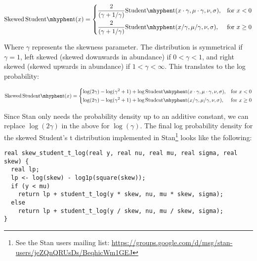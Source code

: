 \[
  \mathrm{Skewed\,Student\mhyphen t}(x) =
\begin{dcases}
\frac{2}{(\gamma + 1/\gamma)}
         \mathrm{Student\mhyphen t}(x \cdot \gamma, \mu \cdot \gamma, \nu, \sigma),& \text{for } x < 0\\
       \frac{2}{(\gamma + 1/\gamma)}
         \mathrm{Student\mhyphen t}(x / \gamma, \mu / \gamma, \nu, \sigma),& \text{for } x \ge 0
\end{dcases}
\]

\smallskip
\noindent
Where $\gamma$ represents the skewness parameter. The distribution is
symmetrical if $\gamma = 1$, left skewed (skewed downwards in abundance) if
$0 < \gamma < 1$, and right skewed (skewed upwards in abundance) if $1 <
\gamma < \infty$. This translates to the log probability:

\[
\mathrm{Skewed\,Student\mhyphen t}(x) =
\begin{dcases}
  \log (2 \gamma) - \log(\gamma^2 + 1) +
  \log \mathrm{Student\mhyphen t}(x \cdot \gamma, \mu \cdot \gamma, \nu, \sigma),& \text{for } x < 0\\
  \log (2 \gamma) - \log(\gamma^2 + 1) +
  \log \mathrm{Student\mhyphen t}(x / \gamma, \mu / \gamma, \nu, \sigma),& \text{for } x \ge 0
\end{dcases}
\]

\smallskip
\noindent
Since Stan only needs the probability density up to an additive constant, we
can replace $\log(2 \gamma)$ in the above for $\log(\gamma)$. The final log
probability density for the skewed Student's t distribution implemented in
Stan\footnote{See the Stan users mailing list: \url{https://groups.google.com/d/msg/stan-users/jeZQnQRUsDs/BeqhicWm1GEJ}} looks like the following:

\begin{verbatim}
real skew_student_t_log(real y, real nu, real mu, real sigma, real skew) {
  real lp;
  lp <- log(skew) - log1p(square(skew));
  if (y < mu)
    return lp + student_t_log(y * skew, nu, mu * skew, sigma);
  else
    return lp + student_t_log(y / skew, nu, mu / skew, sigma);
}
\end{verbatim}



